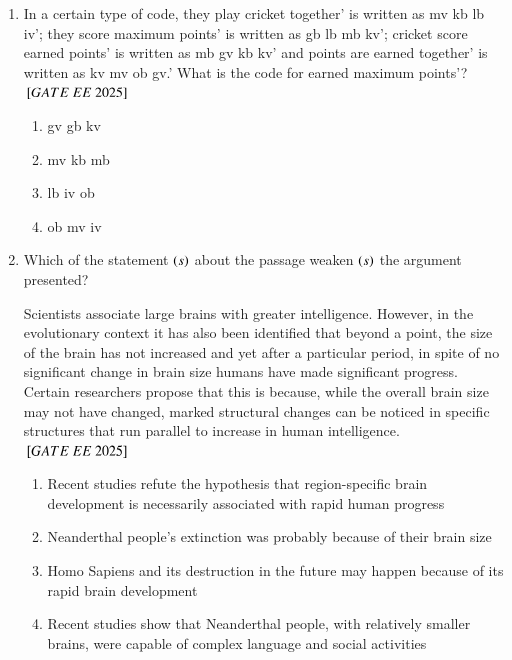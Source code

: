 \documentclass[journal,12pt,onecolumn]{IEEEtran}
\theoremstyle{remark}
\begin{document}
\begin{enumerate}
   \item In a certain type of code, they play cricket together' is written as mv kb lb iv'; they score maximum points' is written as gb lb mb kv'; cricket score earned points' is written as mb gv kb kv' and points are earned together' is written as kv mv ob gv.' \newline
What is the code for earned maximum points'?
\\   
${}\left[GATE\ EE\ 2025\right]$\\
    \begin{enumerate}[label=(\Alph*)]
\item  gv gb kv\\      
  \item mv kb mb \\   
 \item lb iv ob\\   
  \item ob mv iv\\   
    \end{enumerate}

  \item Which of the statement $\left(s\right)$ about the passage weaken $\left(s\right)$ the argument presented? \newline

Scientists associate large brains with greater intelligence. However, in the evolutionary context it has also been identified that beyond a point, the size of the brain has not increased and yet after a particular period, in spite of no significant change in brain size humans have made significant progress. Certain researchers propose that this is because, while the overall brain size may not have changed, marked structural changes can be noticed in specific structures that run parallel to increase in human intelligence. \\   
${}\left[GATE\ EE\ 2025\right]$\\
    \begin{enumerate}[label=(\Alph*)]
\item Recent studies refute the hypothesis that region-specific brain development is
necessarily associated with rapid human progress \\   
  \item Neanderthal people's extinction was probably because of their brain size\\  
  \item Homo Sapiens and its destruction in the future may happen because of its rapid
brain development\\  
  \item Recent studies show that Neanderthal people, with relatively smaller brains, were
capable of complex language and social activities\\  
    \end{enumerate}


\end{enumerate}
\end{document}
